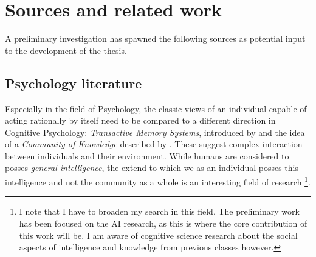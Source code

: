 \documentclass[12pt,a4paper]{article}
\begin{document}
\section{Sources and related work}
A preliminary investigation has spawned the following sources as potential input to the development of the thesis.

\subsection{Psychology literature}
Especially in the field of Psychology, the classic views of an individual capable of acting rationally by itself need to be compared to a different direction in Cognitive Psychology: \emph{Transactive Memory Systems}, introduced by \citeauthor{wegner1995computer} and the idea of a \emph{Community of Knowledge} described by \citeauthor{sloman2016cok}. These suggest complex interaction between individuals and their environment.
While humans are considered to posses \emph{general intelligence}, the extend to which we as an individual posses this intelligence and not the community as a whole is an interesting field of research
\footnote{I note that I have to broaden my search in this field. The preliminary work has been focused on the AI research, as this is where the core contribution of this work will be. I am aware of cognitive science research about the social aspects of intelligence and knowledge from previous classes however.}.

\end{document}

